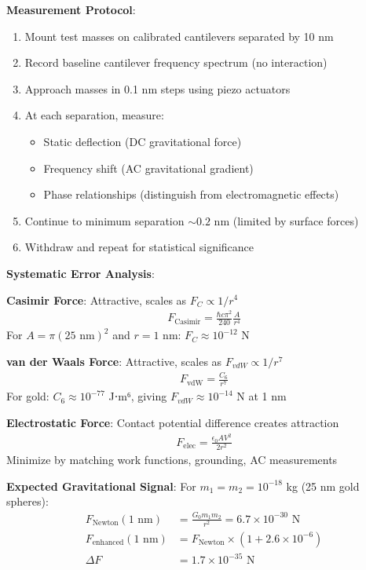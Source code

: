 \documentclass[12pt]{article}
\begin{document}
\textbf{Measurement Protocol}:
\begin{enumerate}
\item Mount test masses on calibrated cantilevers separated by 10 nm
\item Record baseline cantilever frequency spectrum (no interaction)
\item Approach masses in 0.1 nm steps using piezo actuators
\item At each separation, measure:
   \begin{itemize}
   \item Static deflection (DC gravitational force)
   \item Frequency shift (AC gravitational gradient)
   \item Phase relationships (distinguish from electromagnetic effects)
   \end{itemize}
\item Continue to minimum separation $\sim 0.2$ nm (limited by surface forces)
\item Withdraw and repeat for statistical significance
\end{enumerate}

\textbf{Systematic Error Analysis}:

\textbf{Casimir Force}: Attractive, scales as $F_C \propto 1/r^4$
\begin{align}
F_{\text{Casimir}} = \frac{\hbar c \pi^2}{240} \frac{A}{r^4}
\end{align}
For $A = \pi (25 \text{ nm})^2$ and $r = 1$ nm: $F_C \approx 10^{-12}$ N

\textbf{van der Waals Force}: Attractive, scales as $F_{vdW} \propto 1/r^7$  
\begin{align}
F_{\text{vdW}} = \frac{C_6}{r^7}
\end{align}
For gold: $C_6 \approx 10^{-77}$ J⋅m⁶, giving $F_{vdW} \approx 10^{-14}$ N at 1 nm

\textbf{Electrostatic Force}: Contact potential difference creates attraction
\begin{align}
F_{\text{elec}} = \frac{\epsilon_0 A V^2}{2r^2}
\end{align}
Minimize by matching work functions, grounding, AC measurements

\textbf{Expected Gravitational Signal}:
For $m_1 = m_2 = 10^{-18}$ kg (25 nm gold spheres):
\begin{align}
F_{\text{Newton}}(1 \text{ nm}) &= \frac{G_0 m_1 m_2}{r^2} = 6.7 \times 10^{-30} \text{ N} \\
F_{\text{enhanced}}(1 \text{ nm}) &= F_{\text{Newton}} \times (1 + 2.6 \times 10^{-6}) \\
\Delta F &= 1.7 \times 10^{-35} \text{ N}
\end{align}
\end{document}
